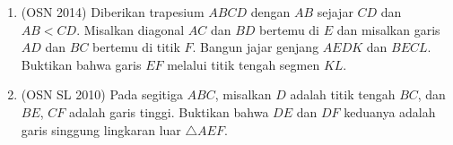 \documentclass[12pt]{scrartcl}
\begin{document}
\begin{enumerate}
    \item (OSN 2014) Diberikan trapesium $ABCD$ dengan $AB$ sejajar $CD$ dan $AB < CD$. Misalkan diagonal $AC$ dan $BD$ bertemu di $E$ dan misalkan garis $AD$ dan $BC$ bertemu di titik $F$. Bangun jajar genjang $AEDK$ dan $BECL$. Buktikan bahwa garis $EF$ melalui titik tengah segmen $KL$.

    \item (OSN SL 2010) Pada segitiga $ABC$, misalkan $D$ adalah titik tengah $BC$, dan $BE$, $CF$ adalah garis tinggi. Buktikan bahwa $DE$ dan $DF$ keduanya adalah garis singgung lingkaran luar $\triangle AEF$. %

\end{enumerate}
\end{document}
